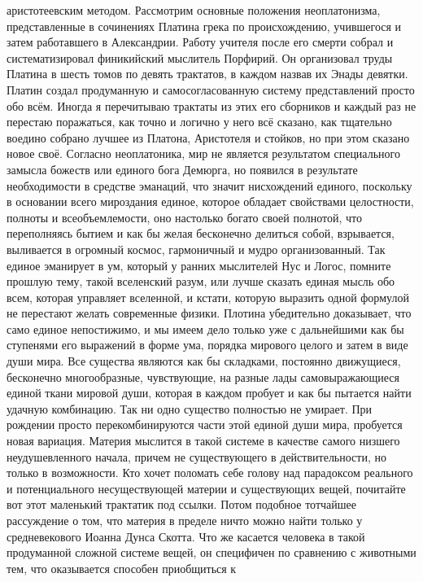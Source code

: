 аристотеевским методом. Рассмотрим основные положения неоплатонизма,
представленные в сочинениях Платина грека по происхождению, учившегося и затем
работавшего в Александрии. Работу учителя после его смерти собрал и
систематизировал финикийский мыслитель Порфирий. Он организовал труды Платина в
шесть томов по девять трактатов, в каждом назвав их Энады девятки. Платин создал
продуманную и самосогласованную систему представлений просто обо всём. Иногда я
перечитываю трактаты из этих его сборников и каждый раз не перестаю поражаться,
как точно и логично у него всё сказано, как тщательно воедино собрано лучшее из
Платона, Аристотеля и стойков, но при этом сказано новое своё. Согласно
неоплатоника, мир не является результатом специального замысла божеств или
единого бога Демюрга, но появился в результате необходимости в средстве
эманаций, что значит нисхождений единого, поскольку в основании всего мироздания
единое, которое обладает свойствами целостности, полноты и всеобъемлемости, оно
настолько богато своей полнотой, что переполняясь бытием и как бы желая
бесконечно делиться собой, взрывается, выливается в огромный космос, гармоничный
и мудро организованный. Так единое эманирует в ум, который у ранних мыслителей
Нус и Логос, помните прошлую тему, такой вселенский разум, или лучше сказать
единая мысль обо всем, которая управляет вселенной, и кстати, которую выразить
одной формулой не перестают желать современные физики. Плотина убедительно
доказывает, что само единое непостижимо, и мы имеем дело только уже с
дальнейшими как бы ступенями его выражений в форме ума, порядка мирового целого
и затем в виде души мира. Все существа являются как бы складками, постоянно
движущиеся, бесконечно многообразные, чувствующие, на разные лады
самовыражающиеся единой ткани мировой души, которая в каждом пробует и как бы
пытается найти удачную комбинацию. Так ни одно существо полностью не умирает.
При рождении просто перекомбинируются части этой единой души мира, пробуется
новая вариация. Материя мыслится в такой системе в качестве самого низшего
неудушевленного начала, причем не существующего в действительности, но только в
возможности. Кто хочет поломать себе голову над парадоксом реального и
потенциального несуществующей материи и существующих вещей, почитайте вот этот
маленький трактатик под ссылки. Потом подобное тотчайшее рассуждение о том, что
материя в пределе ничто можно найти только у средневекового Иоанна Дунса Скотта.
Что же касается человека в такой продуманной сложной системе вещей, он
специфичен по сравнению с животными тем, что оказывается способен приобщиться к
